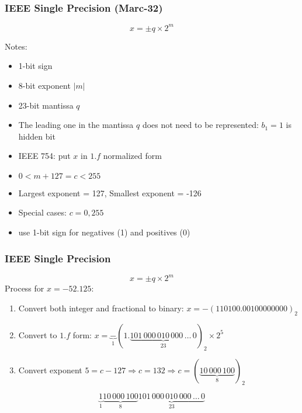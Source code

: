 \documentclass[10pt]{beamer}
\begin{document}
\begin{frame}
\frametitle{IEEE Single Precision (Marc-32)}
\begin{equation*}
  x = \pm q \times 2^m
\end{equation*}
\begin{center}
\end{center}
Notes:
\begin{itemize}
  \item 1-bit sign
  \item 8-bit exponent $|m|$
  \item 23-bit mantissa $q$
  \item The leading one in the mantissa $q$ does not need to be represented:
$b_1=1$ is hidden bit
  \item IEEE 754: put $x$ in $1.f$ normalized form
  \item $0 < m + 127 = c < 255$ 
  \item Largest exponent = 127, Smallest exponent = -126
  \item Special cases: $c=0, 255$
  \item use 1-bit sign for negatives (1) and positives (0)
\end{itemize}
\end{frame}
\begin{frame}
\frametitle{IEEE Single Precision}
\begin{equation*}
  x = \pm q \times 2^m
\end{equation*}
Process for $x=-52.125$:
\begin{enumerate}
  \item Convert both integer and fractional to binary: $x=-(110100.00100000000)_2$
  \item Convert to $1.f$ form:
$x=\underbrace{-}_{1}(1.\underbrace{101\,000\,010\,000\,\dots\,0}_{23})_2\times
2^{5}$
  \item Convert exponent $5 = c-127 \Rightarrow c = 132 \Rightarrow c =
(\underbrace{10\,000\,100}_{8})_2$
\end{enumerate}
\begin{equation*}
\underbrace{1}_{1}
\underbrace{10\,000\,100}_{8}
\underbrace{101\,000\,010\,000\,\dots\,0}_{23}
\end{equation*}
\end{frame}
\end{document}
